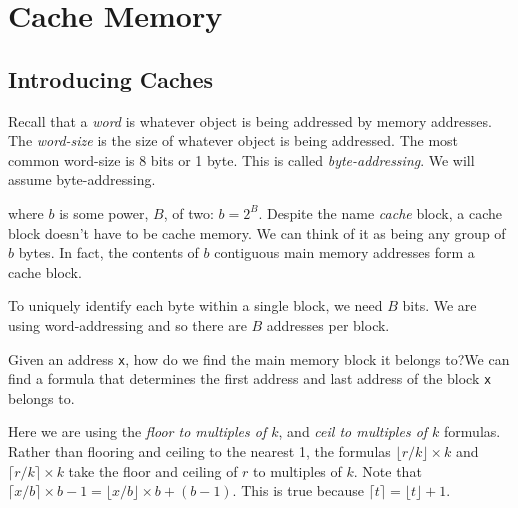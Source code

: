 
\chapter{Cache Memory}


\section{Introducing Caches}

Recall that a \textit{word} is whatever object is being addressed by memory addresses. 
The \textit{word-size} is the size of whatever object is being addressed. 
The most common word-size is 8 bits or 1 byte. 
This is called \textit{byte-addressing}. We will assume byte-addressing.  



where $b$ is some power, $B$, of two: $b = 2^{B}$. 
Despite the name \textit{cache} block, a cache block doesn't have to 
be cache memory. We can think of it as being any group of $b$ bytes. 
In fact, the contents of $b$ contiguous main memory addresses form 
a cache block.

To uniquely identify each byte within a single block, we need $B$ bits. 
We are using word-addressing and so there are $B$ addresses per block.

\frmrule

\begin{example}
Given an address \lstinline{x}, how do we find the main memory 
block it belongs to?We can find a formula that determines the first address 
and last address 
of the block \lstinline{x} belongs to.
\end{example}


Here we are using the \textit{floor to multiples of $k$},
and \textit{ceil to multiples of $k$} formulas.
Rather than flooring and ceiling to the nearest 1, the formulas
$\lfloor r/k \rfloor \times k$ and $\lceil r/k \rceil \times k$
take the floor and ceiling of $r$ to multiples of $k$. 
Note that $\lceil x/b \rceil \times b - 1 = \lfloor x/b \rfloor \times b + (b-1)$.
This is true because $\lceil t \rceil = \lfloor t \rfloor + 1$.



